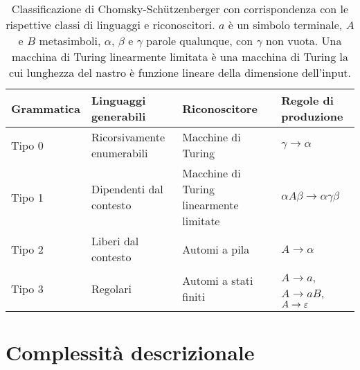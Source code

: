 \begin{table}
	\caption{Classificazione di Chomsky-Schützenberger con corrispondenza con le rispettive classi di linguaggi e riconoscitori. $a$ è un simbolo terminale, $A$ e $B$ metasimboli, $\alpha$, $\beta$ e $\gamma$ parole qualunque, con $\gamma$ non vuota. Una macchina di Turing linearmente limitata è una macchina di Turing la cui lunghezza del nastro è funzione lineare della dimensione dell'input.}
	\label{tab:prel:chomskyhier}
	\centering
	\begin{tabularx}{\textwidth}{lXXl}
		\toprule
		\textbf{Grammatica} & \textbf{Linguaggi generabili} & \textbf{Riconoscitore}                  & \textbf{Regole di produzione}         \\
		\midrule
		Tipo 0              & Ricorsivamente enumerabili    & Macchine di Turing                      & $\gamma\to\alpha$                     \\
		Tipo 1              & Dipendenti dal contesto       & Macchine di Turing linearmente limitate & $\alpha A\beta\to\alpha\gamma\beta$   \\
		Tipo 2              & Liberi dal contesto           & Automi a pila                           & $A\to\alpha$                          \\
		Tipo 3              & Regolari                      & Automi a stati finiti                   & $A\to a$, $A\to aB$, $A\to\varepsilon$ \\
		\bottomrule
	\end{tabularx}
\end{table}



\section{Complessità descrizionale}
